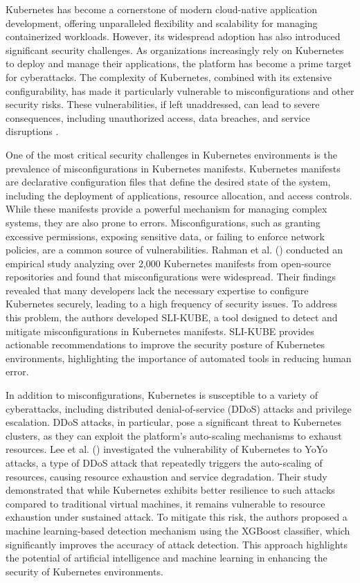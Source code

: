 Kubernetes has become a cornerstone of modern cloud-native application development, offering unparalleled flexibility and scalability for managing containerized workloads. However, its widespread adoption has also introduced significant security challenges. As organizations increasingly rely on Kubernetes to deploy and manage their applications, the platform has become a prime target for cyberattacks. The complexity of Kubernetes, combined with its extensive configurability, has made it particularly vulnerable to misconfigurations and other security risks. These vulnerabilities, if left unaddressed, can lead to severe consequences, including unauthorized access, data breaches, and service disruptions \citep{rahman2023, shamim2021}.

One of the most critical security challenges in Kubernetes environments is the prevalence of misconfigurations in Kubernetes manifests. Kubernetes manifests are declarative configuration files that define the desired state of the system, including the deployment of applications, resource allocation, and access controls. While these manifests provide a powerful mechanism for managing complex systems, they are also prone to errors. Misconfigurations, such as granting excessive permissions, exposing sensitive data, or failing to enforce network policies, are a common source of vulnerabilities. Rahman et al. (\citeyear{rahman2023}) conducted an empirical study analyzing over 2,000 Kubernetes manifests from open-source repositories and found that misconfigurations were widespread. Their findings revealed that many developers lack the necessary expertise to configure Kubernetes securely, leading to a high frequency of security issues. To address this problem, the authors developed SLI-KUBE, a tool designed to detect and mitigate misconfigurations in Kubernetes manifests. SLI-KUBE provides actionable recommendations to improve the security posture of Kubernetes environments, highlighting the importance of automated tools in reducing human error.

In addition to misconfigurations, Kubernetes is susceptible to a variety of cyberattacks, including distributed denial-of-service (DDoS) attacks and privilege escalation. DDoS attacks, in particular, pose a significant threat to Kubernetes clusters, as they can exploit the platform's auto-scaling mechanisms to exhaust resources. Lee et al. (\citeyear{lee2023}) investigated the vulnerability of Kubernetes to YoYo attacks, a type of DDoS attack that repeatedly triggers the auto-scaling of resources, causing resource exhaustion and service degradation. Their study demonstrated that while Kubernetes exhibits better resilience to such attacks compared to traditional virtual machines, it remains vulnerable to resource exhaustion under sustained attack. To mitigate this risk, the authors proposed a machine learning-based detection mechanism using the XGBoost classifier, which significantly improves the accuracy of attack detection. This approach highlights the potential of artificial intelligence and machine learning in enhancing the security of Kubernetes environments.

